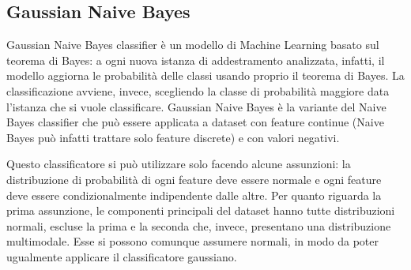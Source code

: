 \subsection{Gaussian Naive Bayes}
Gaussian Naive Bayes classifier è un modello di Machine Learning basato sul
teorema di Bayes: a ogni nuova istanza di addestramento analizzata, infatti,
il modello aggiorna le probabilità delle classi usando proprio il teorema di Bayes.
La classificazione avviene, invece, scegliendo la classe di probabilità maggiore
data l'istanza che si vuole classificare.
Gaussian Naive Bayes è la variante del Naive Bayes classifier che può essere applicata
a dataset con feature continue (Naive Bayes può infatti trattare solo feature 
discrete) e con valori negativi.

Questo classificatore si può utilizzare solo facendo alcune
assunzioni: la distribuzione di probabilità di ogni feature deve essere
normale e ogni feature deve essere condizionalmente indipendente dalle altre.
Per quanto riguarda la prima assunzione, le componenti principali del dataset
hanno tutte distribuzioni normali, escluse la prima e la seconda che, invece,
presentano una distribuzione multimodale. 
Esse si possono comunque assumere normali, in modo da poter ugualmente applicare il 
classificatore gaussiano.

